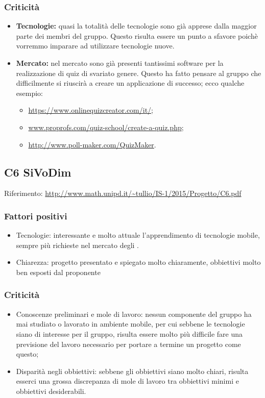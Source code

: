 \documentclass{scalatekids-article}
\begin{document}
\subsubsection{Criticità}
\begin{itemize}
\item \textbf{Tecnologie:} quasi la totalità delle tecnologie sono già apprese dalla maggior parte dei membri del gruppo. Questo risulta essere un punto a sfavore poichè vorremmo imparare ad utilizzare tecnologie nuove.
\item \textbf{Mercato:} nel mercato sono già presenti tantissimi software per la realizzazione di quiz di svariato genere. Questo ha fatto pensare al gruppo che difficilmente si riuscirà a creare un applicazione di successo; ecco qualche esempio:
  \begin{itemize}
  \item\url{https://www.onlinequizcreator.com/it/};
  \item\url{www.proprofs.com/quiz-school/create-a-quiz.php};
  \item\url{http://www.poll-maker.com/QuizMaker}.
  \end{itemize}
\end{itemize}

\subsection{C6 SiVoDim}
Riferimento: \url{http://www.math.unipd.it/~tullio/IS-1/2015/Progetto/C6.pdf}\\
\subsubsection{Fattori positivi}
\begin{itemize}
\item{Tecnologie:} interessante e molto attuale l'apprendimento di tecnologie mobile, sempre più richieste nel mercato degli .
\item{Chiarezza:} progetto presentato e spiegato molto chiaramente, obbiettivi molto ben esposti dal proponente
\end{itemize}
\subsubsection{Criticità}
\begin{itemize}
\item{Conoscenze preliminari e mole di lavoro:} nessun componente del gruppo ha mai studiato o lavorato in ambiente mobile, per cui sebbene le tecnologie siano di interesse per il gruppo, risulta essere molto più difficile fare una previsione del lavoro necessario per portare a termine un progetto come questo;
\item{Disparità negli obbiettivi:} sebbene gli obbiettivi siano molto chiari, risulta esserci una grossa discrepanza di mole di lavoro tra obbiettivi minimi e obbiettivi desiderabili.
\end{itemize}
\end{document}
